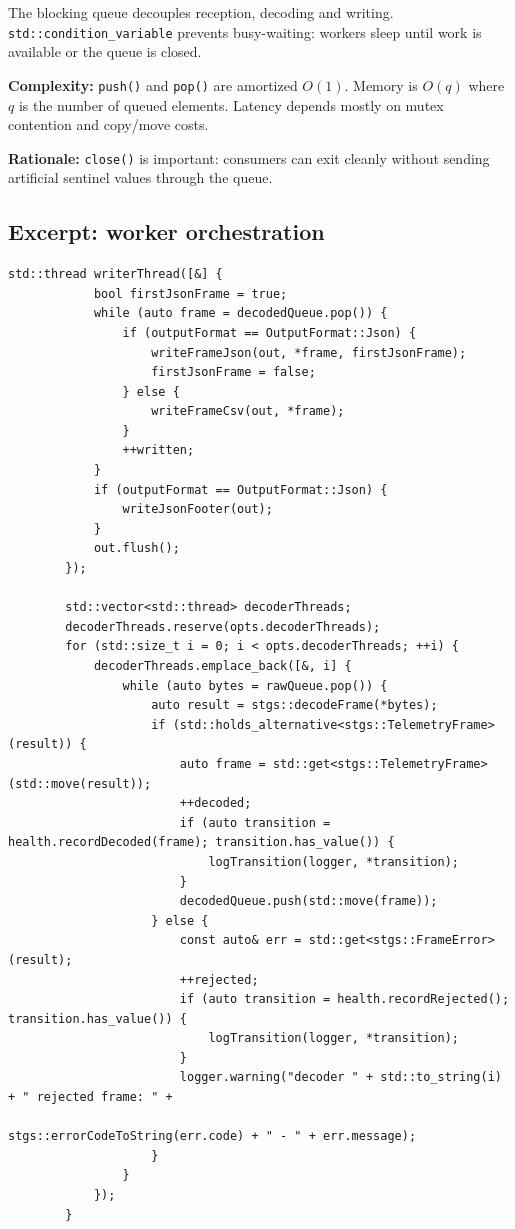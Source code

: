 \documentclass[10pt,a4paper]{article}
\newcommand{\complexity}[1]{\textbf{Complexity:} #1}
\newcommand{\rationale}[1]{\textbf{Rationale:} #1}
\begin{document}
The blocking queue decouples reception, decoding and writing. \texttt{std::condition\_variable} prevents busy-waiting: workers sleep until work is available or the queue is closed.

\complexity{\texttt{push()} and \texttt{pop()} are amortized $O(1)$. Memory is $O(q)$ where $q$ is the number of queued elements. Latency depends mostly on mutex contention and copy/move costs.}

\rationale{\texttt{close()} is important: consumers can exit cleanly without sending artificial sentinel values through the queue.}

\subsection{Excerpt: worker orchestration}
\begin{lstlisting}[caption={Decoder workers and writer thread}]
        std::thread writerThread([&] {
            bool firstJsonFrame = true;
            while (auto frame = decodedQueue.pop()) {
                if (outputFormat == OutputFormat::Json) {
                    writeFrameJson(out, *frame, firstJsonFrame);
                    firstJsonFrame = false;
                } else {
                    writeFrameCsv(out, *frame);
                }
                ++written;
            }
            if (outputFormat == OutputFormat::Json) {
                writeJsonFooter(out);
            }
            out.flush();
        });

        std::vector<std::thread> decoderThreads;
        decoderThreads.reserve(opts.decoderThreads);
        for (std::size_t i = 0; i < opts.decoderThreads; ++i) {
            decoderThreads.emplace_back([&, i] {
                while (auto bytes = rawQueue.pop()) {
                    auto result = stgs::decodeFrame(*bytes);
                    if (std::holds_alternative<stgs::TelemetryFrame>(result)) {
                        auto frame = std::get<stgs::TelemetryFrame>(std::move(result));
                        ++decoded;
                        if (auto transition = health.recordDecoded(frame); transition.has_value()) {
                            logTransition(logger, *transition);
                        }
                        decodedQueue.push(std::move(frame));
                    } else {
                        const auto& err = std::get<stgs::FrameError>(result);
                        ++rejected;
                        if (auto transition = health.recordRejected(); transition.has_value()) {
                            logTransition(logger, *transition);
                        }
                        logger.warning("decoder " + std::to_string(i) + " rejected frame: " +
                                       stgs::errorCodeToString(err.code) + " - " + err.message);
                    }
                }
            });
        }
\end{lstlisting}
\end{document}
